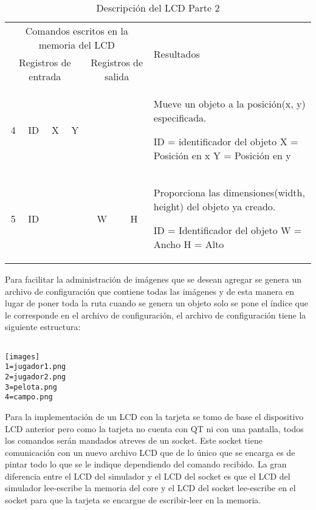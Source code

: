 \begin{table}
\begin{longtable}{|c|c|c|c|c|c|p{4 cm}|}
\multicolumn{6}{|c|}{Comandos escritos en la memoria del LCD}
&
\multirow{2}{*}{Resultados}
\\
\multicolumn{4}{|c|}{Registros de entrada} &
\multicolumn{2}{|c|}{Registros de salida} &
\\
4 & ID & X & Y & & & 

Mueve un objeto a la posición(x, y) especificada.\newline

ID = identificador del objeto\newline
X = Posición en x\newline
Y = Posición en y

\\
\hline
5 & ID &  &  & W & H & 

Proporciona las dimensiones(width, height) del objeto ya creado.\newline

ID = Identificador del objeto\newline
W = Ancho\newline
H = Alto


\\

\end{longtable}
\caption{\label{tab:lcd-desc-2}Descripción del LCD Parte 2}
\end{table}

Para facilitar la administración de imágenes que se desean agregar se genera un archivo de configuración que contiene todas las imágenes y de esta manera en lugar de poner toda la ruta cuando se genera un objeto solo se pone el índice que le corresponde en el archivo de configuración, el archivo de configuración tiene la siguiente estructura:

\begin{verbatim}

[images]
1=jugador1.png
2=jugador2.png
3=pelota.png
4=campo.png

\end{verbatim}

Para la implementación de un LCD con la tarjeta se tomo de base el dispositivo LCD anterior pero como la tarjeta no cuenta con QT ni con una pantalla, todos los comandos serán mandados atreves de un socket. Este socket tiene comunicación con un nuevo archivo LCD que de lo único que se encarga es de pintar todo lo que se le indique dependiendo del comando recibido. La gran diferencia entre el LCD del simulador y el LCD del socket es que el LCD del simulador lee-escribe la memoria del core y el LCD del socket lee-escribe en el socket para que la tarjeta se encargue de escribir-leer en la memoria. 

